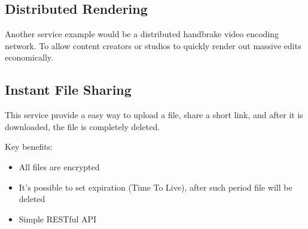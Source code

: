 \subsection{Distributed Rendering}

Another service example would be a distributed handbrake video encoding network. To allow content creators or studios to quickly render out massive edits economically.

\subsection{Instant File Sharing}

This service provide a easy way to upload a file, share a short link, and after it is downloaded, the file is completely deleted.

Key benefits:

\begin{itemize}
    \item All files are encrypted
    \item It's possible to set expiration (Time To Live), after such period file will be deleted
    \item Simple RESTful API
\end{itemize}
